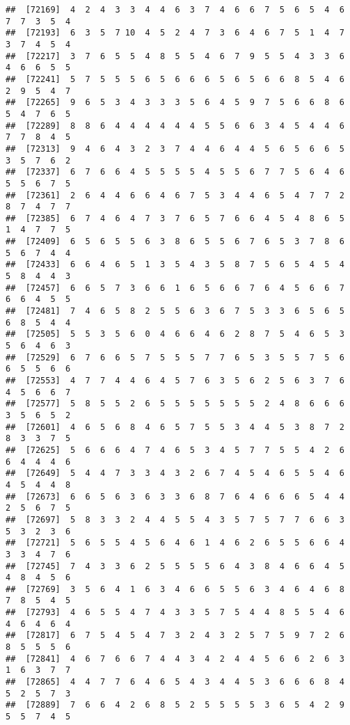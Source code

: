 \documentclass[
]{book}
\begin{document}
\begin{verbatim}
##  [72169]  4  2  4  3  3  4  4  6  3  7  4  6  6  7  5  6  5  4  6  7  7  3  5  4
##  [72193]  6  3  5  7 10  4  5  2  4  7  3  6  4  6  7  5  1  4  7  3  7  4  5  4
##  [72217]  3  7  6  5  5  4  8  5  5  4  6  7  9  5  5  4  3  3  6  4  6  6  5  5
##  [72241]  5  7  5  5  5  6  5  6  6  6  5  6  5  6  6  8  5  4  6  2  9  5  4  7
##  [72265]  9  6  5  3  4  3  3  3  5  6  4  5  9  7  5  6  6  8  6  5  4  7  6  5
##  [72289]  8  8  6  4  4  4  4  4  4  5  5  6  6  3  4  5  4  4  6  7  7  8  4  5
##  [72313]  9  4  6  4  3  2  3  7  4  4  6  4  4  5  6  5  6  6  5  3  5  7  6  2
##  [72337]  6  7  6  6  4  5  5  5  5  4  5  5  6  7  7  5  6  4  6  5  5  6  7  5
##  [72361]  2  6  4  4  6  6  4  6  7  5  3  4  4  6  5  4  7  7  2  8  7  4  7  7
##  [72385]  6  7  4  6  4  7  3  7  6  5  7  6  6  4  5  4  8  6  5  1  4  7  7  5
##  [72409]  6  5  6  5  5  6  3  8  6  5  5  6  7  6  5  3  7  8  6  5  6  7  4  4
##  [72433]  6  6  4  6  5  1  3  5  4  3  5  8  7  5  6  5  4  5  4  5  8  4  4  3
##  [72457]  6  6  5  7  3  6  6  1  6  5  6  6  7  6  4  5  6  6  7  6  6  4  5  5
##  [72481]  7  4  6  5  8  2  5  5  6  3  6  7  5  3  3  6  5  6  5  6  8  5  4  4
##  [72505]  5  5  3  5  6  0  4  6  6  4  6  2  8  7  5  4  6  5  3  5  6  4  6  3
##  [72529]  6  7  6  6  5  7  5  5  5  7  7  6  5  3  5  5  7  5  6  6  5  5  6  6
##  [72553]  4  7  7  4  4  6  4  5  7  6  3  5  6  2  5  6  3  7  6  4  5  6  6  7
##  [72577]  5  8  5  5  2  6  5  5  5  5  5  5  5  2  4  8  6  6  6  3  5  6  5  2
##  [72601]  4  6  5  6  8  4  6  5  7  5  5  3  4  4  5  3  8  7  2  8  3  3  7  5
##  [72625]  5  6  6  6  4  7  4  6  5  3  4  5  7  7  5  5  4  2  6  6  4  4  4  6
##  [72649]  5  4  4  7  3  3  4  3  2  6  7  4  5  4  6  5  5  4  6  4  5  4  4  8
##  [72673]  6  6  5  6  3  6  3  3  6  8  7  6  4  6  6  6  5  4  4  2  5  6  7  5
##  [72697]  5  8  3  3  2  4  4  5  5  4  3  5  7  5  7  7  6  6  3  5  3  2  3  6
##  [72721]  5  6  5  5  4  5  6  4  6  1  4  6  2  6  5  5  6  6  4  3  3  4  7  6
##  [72745]  7  4  3  3  6  2  5  5  5  5  6  4  3  8  4  6  6  4  5  4  8  4  5  6
##  [72769]  3  5  6  4  1  6  3  4  6  6  5  5  6  3  4  6  4  6  8  7  8  5  4  5
##  [72793]  4  6  5  5  4  7  4  3  3  5  7  5  4  4  8  5  5  4  6  4  6  4  6  4
##  [72817]  6  7  5  4  5  4  7  3  2  4  3  2  5  7  5  9  7  2  6  8  5  5  5  6
##  [72841]  4  6  7  6  6  7  4  4  3  4  2  4  4  5  6  6  2  6  3  1  6  3  7  7
##  [72865]  4  4  7  7  6  4  6  5  4  3  4  4  5  3  6  6  6  8  4  5  2  5  7  3
##  [72889]  7  6  6  4  2  6  8  5  2  5  5  5  5  3  6  5  4  2  9  5  5  7  4  5

\end{verbatim}
\end{document}
